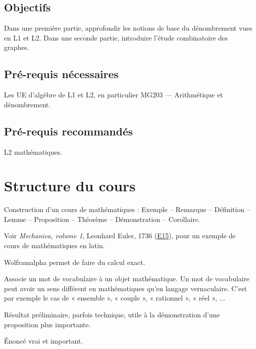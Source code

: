 \subsection*{Objectifs}

Dans une première partie, approfondir les notions de base du dénombrement vues en L1 et L2.
Dans une seconde partie, introduire l'étude combinatoire des graphes.

\subsection*{Pré-requis nécessaires}

Les UE d'algèbre de L1 et L2, en particulier MG203 --- Arithmétique et dénombrement.

\subsection*{Pré-requis recommandés}

L2 mathématiques.

\section*{Structure du cours}

Construction d'un cours de mathématiques : Exemple -- Remarque -- Définition -- Lemme -- Proposition -- Théorème -- Démonstration -- Corollaire.

Voir \emph{Mechanica, volume 1}, Leonhard Euler, 1736 (\href{https://scholarlycommons.pacific.edu/euler-works/15/}{E15}), pour un exemple de cours de mathématiques en latin.

Wolframalpha permet de faire du calcul exact.

\begin{definition*}
Associe un mot de vocabulaire à un objet mathématique.
Un mot de vocabulaire peut avoir un sens différent en mathématiques qu'en langage vernaculaire.
C'est par exemple le cas de « ensemble », « couple », « rationnel », « réel », ...
\end{definition*}

\begin{lemme*}
	Résultat préliminaire, parfois technique, utile à la démonstration d'une proposition plus importante.
\end{lemme*}

\begin{proposition*}
	Énoncé vrai et important.
\end{proposition*}

